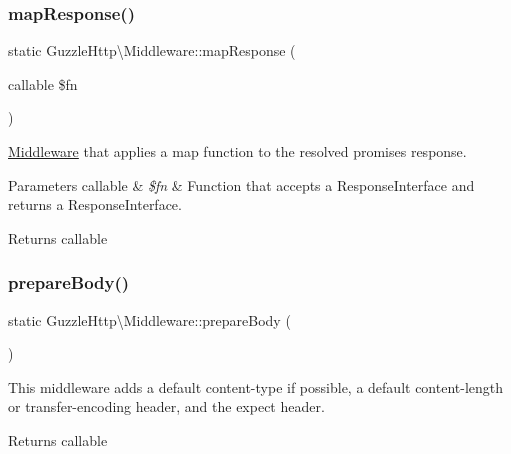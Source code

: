 \subsubsection{\texorpdfstring{map\+Response()}{mapResponse()}}
{\footnotesize\ttfamily static Guzzle\+Http\textbackslash{}\+Middleware\+::map\+Response (\begin{DoxyParamCaption}\item[{callable}]{\$fn }\end{DoxyParamCaption})\hspace{0.3cm}{\ttfamily [static]}}

\hyperlink{classGuzzleHttp_1_1Middleware}{Middleware} that applies a map function to the resolved promise\textquotesingle{}s response.


\begin{DoxyParams}[1]{Parameters}
callable & {\em \$fn} & Function that accepts a Response\+Interface and returns a Response\+Interface. \\
\hline
\end{DoxyParams}
\begin{DoxyReturn}{Returns}
callable 
\end{DoxyReturn}
\mbox{\label{classGuzzleHttp_1_1Middleware_aa12c25e34cb9d0f743b1d8b4cf4a8087}} 
\subsubsection{\texorpdfstring{prepare\+Body()}{prepareBody()}}
{\footnotesize\ttfamily static Guzzle\+Http\textbackslash{}\+Middleware\+::prepare\+Body (\begin{DoxyParamCaption}{ }\end{DoxyParamCaption})\hspace{0.3cm}{\ttfamily [static]}}

This middleware adds a default content-\/type if possible, a default content-\/length or transfer-\/encoding header, and the expect header.

\begin{DoxyReturn}{Returns}
callable 
\end{DoxyReturn}
\mbox{\label{classGuzzleHttp_1_1Middleware_a6d1b4274e26f8f1f3c51b1e4844ec9ec}} 
